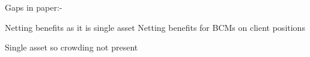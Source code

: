 Gaps in paper:-

Netting benefits as it is single asset
Netting benefits for BCMs on client positions

Single asset so crowding not present